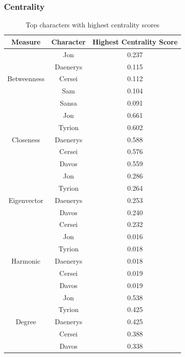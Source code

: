 \documentclass[10pt,twocolumn,letterpaper]{article}
\begin{document}
\subsubsection{Centrality}

\begin{table}[!h]
    \centering
    \small
    \begin{tabular}{c|c|c}
        Measure & Character & \small{Highest Centrality Score} \\
        \hline
                    &Jon & 0.237 \\
                    &Daenerys & 0.115 \\
        Betweenness &Cersei & 0.112 \\
                    &Sam & 0.104 \\
                    &Sansa & 0.091 \\
        \hline 
                    &Jon & 0.661 \\
                    &Tyrion & 0.602 \\
        Closeness   &Daenerys & 0.588 \\
                    &Cersei & 0.576 \\
                    &Davos & 0.559 \\
        \hline 
                    &Jon & 0.286 \\
                    &Tyrion & 0.264 \\
        Eigenvector &Daenerys & 0.253 \\
                    &Davos & 0.240 \\
                    &Cersei & 0.232 \\
        \hline 
                    &Jon & 0.016 \\
                    &Tyrion & 0.018 \\
        Harmonic    & Daenerys & 0.018 \\
                    &Cersei & 0.019 \\
                    &Davos & 0.019 \\
        \hline
                    &Jon & 0.538 \\
                    &Tyrion & 0.425 \\
        Degree      &Daenerys & 0.425 \\
                    &Cersei & 0.388 \\
                    &Davos & 0.338 \\
        \hline
    \end{tabular}
    \vspace{0.2cm}
    \caption{Top characters with highest centrality scores}
    \label{tab:my_label}
\end{table}
\end{document}
